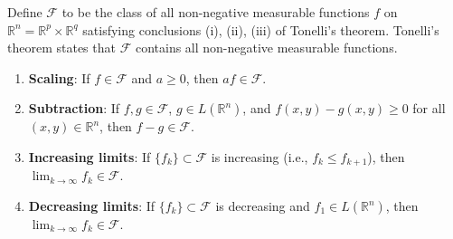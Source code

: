 \documentclass[11pt]{report}
\begin{document}
\begin{defbox}
Define $\mathcal{F}$ to be the class of all non-negative measurable functions $f$ on $\mathbb{R}^n = \mathbb{R}^p \times \mathbb{R}^q$ satisfying conclusions (i), (ii), (iii) of Tonelli's theorem. Tonelli's theorem states that $\mathcal{F}$ contains all non-negative measurable functions.
\end{defbox}

\begin{lembox}
\begin{enumerate}[label=(\arabic*)]
\item \textbf{Scaling}: If $f \in \mathcal{F}$ and $a \geq 0$, then $af \in \mathcal{F}$.
\item \textbf{Subtraction}: If $f, g \in \mathcal{F}$, $g \in L(\mathbb{R}^n)$, and $f(x,y) - g(x,y) \geq 0$ for all $(x,y) \in \mathbb{R}^n$, then $f - g \in \mathcal{F}$.
\item \textbf{Increasing limits}: If $\{f_k\} \subset \mathcal{F}$ is increasing (i.e., $f_k \leq f_{k+1}$), then $\lim_{k \to \infty} f_k \in \mathcal{F}$.
\item \textbf{Decreasing limits}: If $\{f_k\} \subset \mathcal{F}$ is decreasing and $f_1 \in L(\mathbb{R}^n)$, then $\lim_{k \to \infty} f_k \in \mathcal{F}$.
\end{enumerate}
\end{lembox}
\end{document}
